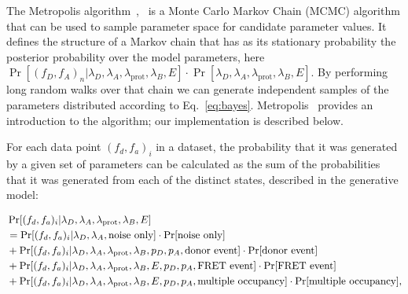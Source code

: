 The Metropolis algorithm~\cite{metropolis53},~\cite{hastings70} is a Monte Carlo Markov Chain (MCMC) algorithm that can be used to sample parameter space for candidate parameter values. It defines the structure of a Markov chain that has as its stationary probability the posterior probability over the model parameters, here $\Pr[(f_D, f_A)_n |\lambda_D, \lambda_A, \lambda_{\text{prot}}, \lambda_B, E] \cdot \Pr[\lambda_D, \lambda_A, \lambda_{\text{prot}}, \lambda_B, E]$. By performing long random walks over that chain we can generate independent samples of the parameters distributed according to Eq.~\ref{eq:bayes}. Metropolis~\cite{chib95} provides an introduction to the algorithm; our implementation is described below.


For each data point $(f_d, f_a)_i$ in a dataset, the probability that it was generated by a given set of parameters can be calculated as the sum of the probabilities that it was generated from each of the distinct states, described in the generative model:

\begin{equation}
\begin{aligned}
\footnotesize
&\Pr[(f_d, f_a)_i|\lambda_D, \lambda_A, \lambda_{\text{prot}}, \lambda_B, E] \\ 
&= \Pr[(f_d, f_a)_i|\lambda_D, \lambda_A, \text{noise only}] \cdot \Pr[\text{noise only}] \\
&+ \Pr[(f_d, f_a)_i|\lambda_D, \lambda_A, \lambda_{\text{prot}}, \lambda_B, p_D, p_A, \text{donor event}] \cdot \Pr[\text{donor event}]\\ 
&+ \Pr[(f_d, f_a)_i|\lambda_D, \lambda_A, \lambda_{\text{prot}}, \lambda_B, E, p_D, p_A, \text{FRET event}] \cdot \Pr[\text{FRET event}] \\
&+ \Pr[(f_d, f_a)_i|\lambda_D, \lambda_A, \lambda_{\text{prot}}, \lambda_B, E, p_D, p_A, \text{multiple occupancy}] \cdot \Pr[\text{multiple occupancy}], \\
\label{eq:multi_sum}
\end{aligned}
\end{equation}


